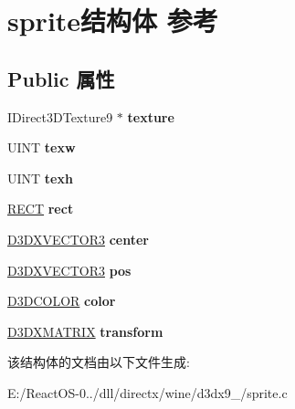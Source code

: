 \hypertarget{structsprite}{}\section{sprite结构体 参考}
\label{structsprite}
\subsection*{Public 属性}
\begin{DoxyCompactItemize}
\item 
\mbox{\label{structsprite_a3ac27300d24f8178a109e61ac5602827}} 
I\+Direct3\+D\+Texture9 $\ast$ {\bfseries texture}
\item 
\mbox{\label{structsprite_afed83b900d66900a3c65bc992050f1f1}} 
U\+I\+NT {\bfseries texw}
\item 
\mbox{\label{structsprite_a517b1ccac3dfeabc2258acc2946be049}} 
U\+I\+NT {\bfseries texh}
\item 
\mbox{\label{structsprite_a8922fbd8a6bdd79351e89101906c5665}} 
\hyperlink{structtag_r_e_c_t}{R\+E\+CT} {\bfseries rect}
\item 
\mbox{\label{structsprite_a20e7bace8fc0ffcf1853074d233aef29}} 
\hyperlink{struct___d3_d_v_e_c_t_o_r}{D3\+D\+X\+V\+E\+C\+T\+O\+R3} {\bfseries center}
\item 
\mbox{\label{structsprite_a414bfae30df3c732d6ce17dd029e77b8}} 
\hyperlink{struct___d3_d_v_e_c_t_o_r}{D3\+D\+X\+V\+E\+C\+T\+O\+R3} {\bfseries pos}
\item 
\mbox{\label{structsprite_a11291129abc4bffb3889c6ef63e776d7}} 
\hyperlink{struct_d3_d_c_o_l_o_r}{D3\+D\+C\+O\+L\+OR} {\bfseries color}
\item 
\mbox{\label{structsprite_aae89bf7acec65bf2fccc853e55b86440}} 
\hyperlink{struct___d3_d_m_a_t_r_i_x}{D3\+D\+X\+M\+A\+T\+R\+IX} {\bfseries transform}
\end{DoxyCompactItemize}


该结构体的文档由以下文件生成\+:\begin{DoxyCompactItemize}
\item 
E\+:/\+React\+O\+S-\/0../dll/directx/wine/d3dx9\+\_/sprite.\+c\end{DoxyCompactItemize}
